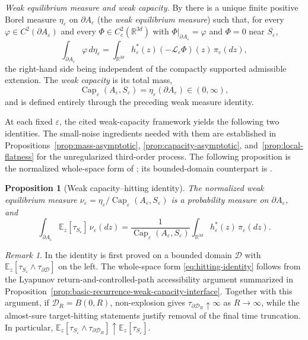 \documentclass[11pt]{article}
\numberwithin{equation}{section}
\theoremstyle{plain}
\newtheorem{proposition}[theorem]{Proposition}
\theoremstyle{definition}
\theoremstyle{remark}
\newtheorem{remark}[theorem]{Remark}
\newcommand{\R}{\mathbb R}
\newcommand{\eps}{\varepsilon}
\renewcommand{\Cap}{\operatorname{Cap}}
\newcommand{\E}{\mathbb E}
\newcommand{\calD}{\mathcal D}
\newcommand{\calL}{\mathcal L}
\begin{document}
\emph{Weak equilibrium measure and weak capacity.}  By
\cite[Proposition~2.49]
{HeLiWangZhu2026WeakEquilibrium} there is a unique finite positive Borel
measure $\eta_\eps$ on $\partial A_\eps$ (the \emph{weak equilibrium measure})
such that, for every $\varphi\in C^2(\partial A_\eps)$ and every
$\Phi\in C_c^2(\R^{3d})$ with
$\Phi|_{\partial A_\eps}=\varphi$ and $\Phi=0$ near $\overline{S_\eps}$,
\[
\int_{\partial A_\eps}\varphi\,d\eta_\eps
=\int_{\R^{3d}}h_\eps^*(z)\left(-\calL_\eps\Phi\right)(z)\,\pi_\eps(dz),
\]
the right-hand side being independent of the compactly supported admissible
extension.
The \emph{weak capacity} is its total mass,
\[
\Cap_\eps(A_\eps,S_\eps)=\eta_\eps(\partial A_\eps)\in(0,\infty),
\]
and is defined entirely through the preceding weak measure identity.

At each fixed $\eps$, the cited weak-capacity framework yields the following
two identities.  The small-noise ingredients needed with them are established
in Propositions~\ref{prop:mass-asymptotic},
\ref{prop:capacity-asymptotic}, and~\ref{prop:local-flatness} for the
unregularized third-order process.
The following proposition 
is the normalized whole-space form of
\cite[Proposition~2.49]
{HeLiWangZhu2026WeakEquilibrium}; its bounded-domain counterpart is
\cite[Theorem~2.42 and Corollary~2.43]
{HeLiWangZhu2026WeakEquilibrium}.

\begin{proposition}[Weak capacity--hitting identity]
\label{prop:hitting-identity}
The normalized weak equilibrium measure
$\nu_\eps=\eta_\eps/\Cap_\eps(A_\eps,S_\eps)$ is a probability measure on
$\partial A_\eps$, and
\begin{equation}
\label{eq:hitting-identity}
\int_{\partial A_\eps} \E_z[\tau_{S_\eps}]\,\nu_\eps(dz)
=
\frac{1}{\Cap_\eps(A_\eps,S_\eps)}
\int_{\R^{3d}} h_\eps^*(z)\,\pi_\eps(dz).
\end{equation}
\end{proposition}

\begin{remark}
In \cite{HeLiWangZhu2026WeakEquilibrium} the identity is first proved on a
bounded domain $\calD$ with $\E_z[\tau_{S_\eps}\wedge\tau_{\partial\calD}]$ on
the left.  The whole-space form \eqref{eq:hitting-identity} follows from the
Lyapunov return-and-controlled-path accessibility argument summarized in
Proposition~\ref{prop:basic-recurrence-weak-capacity-interface}.  Together with
this argument, if $\calD_R=B(0,R)$, non-explosion gives
$\tau_{\partial\calD_R}\uparrow\infty$ as $R\to\infty$, while the
almost-sure target-hitting statements justify removal of the final time
truncation.  In particular,
$\E_z[\tau_{S_\eps}\wedge\tau_{\partial\calD_R}]
\uparrow\E_z[\tau_{S_\eps}]$.
\end{remark}
\end{document}
